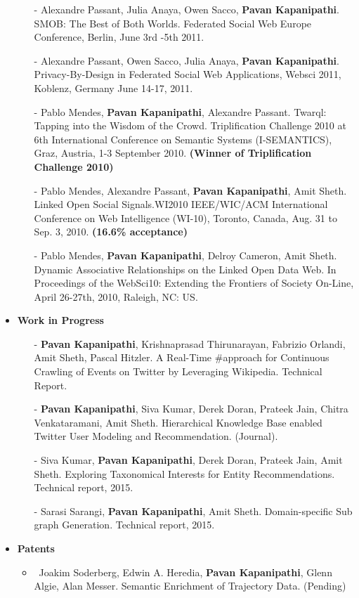 \documentclass[letterpaper,9pt]{article}
\begin{document}
\begin{itemize}
\begin{itemize}
\item[-]  Alexandre Passant, Julia Anaya, Owen Sacco, \textbf{Pavan Kapanipathi}. SMOB: The Best of Both Worlds. 
Federated Social Web Europe Conference, Berlin, June 3rd -5th 2011.
\item[-] Alexandre Passant, Owen Sacco, Julia Anaya, \textbf{Pavan Kapanipathi}. Privacy-By-Design in Federated Social Web Applications,  
Websci 2011, Koblenz, Germany June 14-17, 2011.
	\item[-] Pablo Mendes, \textbf{Pavan Kapanipathi}, Alexandre Passant. Twarql: Tapping into the Wisdom of the Crowd. Triplification Challenge 2010 at 6th International Conference on Semantic Systems (I-SEMANTICS), Graz, Austria, 1-3 September 2010. \textbf{(Winner of Triplification Challenge 2010)}
  \item[-] Pablo Mendes, Alexandre Passant, \textbf{Pavan Kapanipathi}, Amit Sheth. Linked Open Social Signals.WI2010 IEEE/WIC/ACM International Conference on Web Intelligence (WI-10), Toronto, Canada, Aug. 31 to Sep. 3, 2010. \textbf{(16.6\% acceptance)}
  \item[-] Pablo Mendes, \textbf{Pavan Kapanipathi}, Delroy Cameron, Amit Sheth. Dynamic Associative Relationships on the Linked Open Data Web. In Proceedings of the WebSci10: Extending the Frontiers of Society On-Line, April 26-27th, 2010, Raleigh, NC: US.      
\end{itemize}
\item \textbf{Work in Progress}
\begin{itemize}
\item[-] \textbf{Pavan Kapanipathi}, Krishnaprasad Thirunarayan, Fabrizio Orlandi, Amit Sheth, Pascal Hitzler. A Real-Time \#approach for Continuous Crawling of Events on Twitter by Leveraging Wikipedia. Technical Report.
\item[-] \textbf{Pavan Kapanipathi}, Siva Kumar, Derek Doran, Prateek Jain, Chitra Venkataramani, Amit Sheth. Hierarchical Knowledge Base enabled Twitter User Modeling and Recommendation. (Journal).
\item[-] Siva Kumar, \textbf{Pavan Kapanipathi}, Derek Doran, Prateek Jain, Amit Sheth. Exploring Taxonomical Interests for Entity Recommendations. Technical report, 2015.
\item[-] Sarasi Sarangi, \textbf{Pavan Kapanipathi}, Amit Sheth. Domain-specific Sub graph Generation. Technical report, 2015.


\end{itemize}
\item \textbf{Patents}
\begin{itemize}
\item\ Joakim Soderberg, Edwin A. Heredia, \textbf{Pavan Kapanipathi}, Glenn Algie,  Alan Messer. Semantic Enrichment of Trajectory Data. (Pending)
\end{itemize}
\end{itemize}
\end{document}
